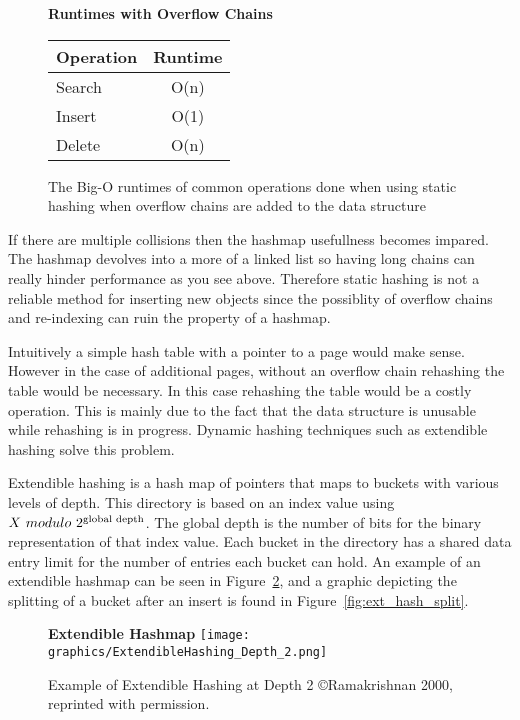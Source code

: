 \documentclass[letterpaper, 12pt]{article}
\begin{document}
\begin{figure}[H]
\centering
\textbf{Runtimes with Overflow Chains}
\\
\begin{tabular}{l | c}
  \hline
  Operation & Runtime \\ \hline \hline
  Search & O(n) \\ \hline
  Insert & O(1) \\ \hline
  Delete & O(n) \\ \hline
\end{tabular}
\caption{The Big-O runtimes of common operations done when using static hashing
when overflow chains are added to the data structure}
\label{fig:static_hash_runtimes_overflow}
\end{figure}

If there are multiple collisions then the hashmap usefullness becomes impared. The hashmap devolves into a more
of a linked list so having long chains can really hinder performance as you see above. Therefore static hashing
is not a reliable method for inserting new objects since the possiblity of overflow chains and re-indexing can
ruin the property of a hashmap.
\par\vspace{\baselineskip}

Intuitively a simple hash table with a pointer to a page would make sense. However in the case of
additional pages, without an overflow chain rehashing the table would be necessary. In this
case rehashing the table would be a costly operation. This is mainly due to the fact that the data structure is unusable
while rehashing is in progress. Dynamic hashing techniques such as extendible hashing solve this problem.
\par\vspace{\baselineskip}

Extendible hashing is a hash map of pointers that maps to buckets with various levels of depth. This directory
is based on an index value using $ X\ modulo\ 2\textsuperscript{global depth} $. The global depth is the number of bits for the binary
representation of that index value. Each bucket in the directory has a shared data entry limit for the number of
entries each bucket can hold. An example of an extendible hashmap can be seen in Figure~\ref{fig:ext_hash_example},
and a graphic depicting the splitting of a bucket after an insert is found in Figure~\ref{fig:ext_hash_split}.

\begin{figure}[H]
  \centering
  \textbf{Extendible Hashmap}
  \texttt{[image: graphics/ExtendibleHashing\_Depth\_2.png]}
  \caption{Example of Extendible Hashing at Depth 2 \copyright Ramakrishnan 2000, reprinted with permission.\cite{ramakrishnan2000database}}
  \label{fig:ext_hash_example}
\end{figure}
\end{document}
